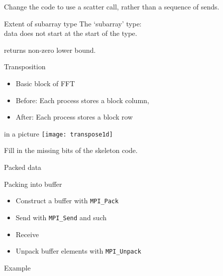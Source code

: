 \begin{exerciseframe}[stridescatter]
  Change the  code to use a scatter call,
  rather than a sequence of sends.
\end{exerciseframe}

\begin{numberedframe}{Extent of subarray type}
  The `subarray' type: \\
  data does not start at the start of the type.

   returns
  non-zero lower bound.
\end{numberedframe}

\begin{numberedframe}{Transposition}
  \begin{itemize}
  \item Basic block of FFT
  \item Before: Each process stores a block column,
  \item After: Each process stores a block row
  \end{itemize}
\end{numberedframe}

\begin{numberedframe}{in a picture}
  \texttt{[image: transpose1d]}
\end{numberedframe}

\begin{exerciseframe}[transposeblock]
  Fill in the missing bits of the skeleton code.  
\end{exerciseframe}

 {Packed data}

\begin{numberedframe}{Packing into buffer}
  \begin{itemize}
  \item
    Construct a buffer with \lstinline{MPI_Pack}
  \item Send with \lstinline{MPI_Send} and such
  \item Receive
  \item Unpack buffer elements with \lstinline{MPI_Unpack}
  \end{itemize}


\end{numberedframe}


\begin{numberedframe}{Example}
\small
{}
\end{numberedframe}

